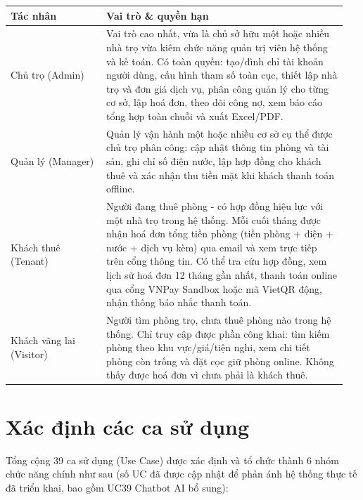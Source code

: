 \documentclass[a4paper,oneside]{report}
\begin{document}
\begin{longtable}[]{@{}>{\RaggedRight\arraybackslash}p{0.27\linewidth}>{\RaggedRight\arraybackslash}p{0.68\linewidth}@{}}
\toprule
\textbf{Tác nhân} & \textbf{Vai trò \& quyền hạn}\tabularnewline
\midrule
\endhead
Chủ trọ (Admin) & Vai trò cao nhất, vừa là chủ sở hữu một hoặc nhiều nhà
trọ vừa kiêm chức năng quản trị viên hệ thống và kế toán. Có toàn quyền:
tạo/đình chỉ tài khoản người dùng, cấu hình tham số toàn cục, thiết lập
nhà trọ và đơn giá dịch vụ, phân công quản lý cho từng cơ sở, lập hoá
đơn, theo dõi công nợ, xem báo cáo tổng hợp toàn chuỗi và xuất
Excel/PDF.\tabularnewline
Quản lý (Manager) & Quản lý vận hành một hoặc nhiều cơ sở cụ thể được
chủ trọ phân công: cập nhật thông tin phòng và tài sản, ghi chỉ số điện
nước, lập hợp đồng cho khách thuê và xác nhận thu tiền mặt khi khách
thanh toán offline.\tabularnewline
Khách thuê (Tenant) & Người đang thuê phòng - có hợp đồng hiệu lực với
một nhà trọ trong hệ thống. Mỗi cuối tháng được nhận hoá đơn tổng tiền
phòng (tiền phòng + điện + nước + dịch vụ kèm) qua email và xem trực
tiếp trên cổng thông tin. Có thể tra cứu hợp đồng, xem lịch sử hoá đơn
12 tháng gần nhất, thanh toán online qua cổng VNPay Sandbox hoặc mã
VietQR động, nhận thông báo nhắc thanh toán.\tabularnewline
Khách vãng lai (Visitor) & Người tìm phòng trọ, chưa thuê phòng nào
trong hệ thống. Chỉ truy cập được phần công khai: tìm kiếm phòng theo
khu vực/giá/tiện nghi, xem chi tiết phòng còn trống và đặt cọc giữ phòng
online. Không thấy được hoá đơn vì chưa phải là khách
thuê.\tabularnewline
\bottomrule
\end{longtable}

\section{Xác định các ca sử dụng}

Tổng cộng 39 ca sử dụng (Use Case) được xác định và tổ chức thành 6 nhóm
chức năng chính như sau (số UC đã được cập nhật để phản ánh hệ thống
thực tế đã triển khai, bao gồm UC39 Chatbot AI bổ sung):
\end{document}
